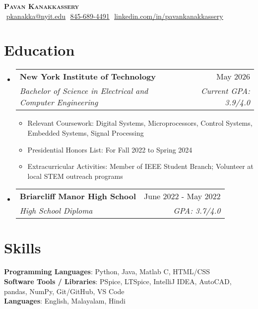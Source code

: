 \documentclass[letterpaper,11pt]{article}
\makeatletter
\newcommand{\resumeItem}[1]{
  \item\small{
    {#1 \vspace{-2pt}}
  }
}
\newcommand{\resumeSubheading}[4]{
  \vspace{-2pt}\item
    \begin{tabular*}{0.97\textwidth}[t]{l@{\extracolsep{\fill}}r}
      \textbf{#1} & #2 \\
      \textit{\small#3} & \textit{\small #4} \\
    \end{tabular*}\vspace{-7pt}
}
\newcommand{\resumeSubHeadingListStart}{\begin{itemize}[leftmargin=0.15in, label={}]}
\newcommand{\resumeSubHeadingListEnd}{\end{itemize}}
\newcommand{\resumeItemListStart}{\begin{itemize}}
\newcommand{\resumeItemListEnd}{\end{itemize}\vspace{-5pt}}
\makeatother
\begin{document}
\begin{flushright}
  \vspace{-4pt}
\end{flushright}

\vspace{-7pt}

\begin{center}
    \textbf{\Huge \scshape Pavan Kanakkassery} \\ \vspace{8pt}
    \small 
    \faEnvelope$  $
    \href{mailto:pkanakka@nyit.edu}
    {\underline{pkanakka@nyit.edu}}
    \faPhone$  $
    \underline{845-689-4491}
    \faLinkedin$  $
    \href{https://linkedin.com/in/pavankanakkassery}{\underline{linkedin.com/in/pavankanakkassery}} $  $
\end{center}

\section{Education}
  \resumeSubHeadingListStart
  
    \resumeSubheading
      {New York Institute of Technology}{May 2026}
      {Bachelor of Science in Electrical and Computer Engineering}{Current GPA: 3.9/4.0}
      
      \resumeItemListStart 
      \resumeItem{Relevant Coursework:} {Digital Systems, Microprocessors, Control Systems, Embedded Systems, Signal Processing} 
      \resumeItem{Presidential Honors List:} {For Fall 2022 to Spring 2024} 
      \resumeItem{Extracurricular Activities:} {Member of IEEE Student Branch; Volunteer at local STEM outreach programs} 
      \resumeItemListEnd
      
    \resumeSubheading
      {Briarcliff Manor High School }{June 2022 - May 2022}
      {High School Diploma}{GPA: 3.7/4.0}
      

  \resumeSubHeadingListEnd

\section{Skills}
 \begin{itemize}[leftmargin=0.15in, label={}]
    \small{\item{
    
     \textbf{Programming Languages}{: Python, Java, Matlab C, HTML/CSS} \\
     
     \textbf{Software Tools / Libraries}{: PSpice, LTSpice, IntelliJ IDEA, AutoCAD, pandas, NumPy, Git/GitHub,  VS Code} \\

     \textbf{Languages}{: English, Malayalam, Hindi} \\
     
    }}
 \end{itemize}
\end{document}
